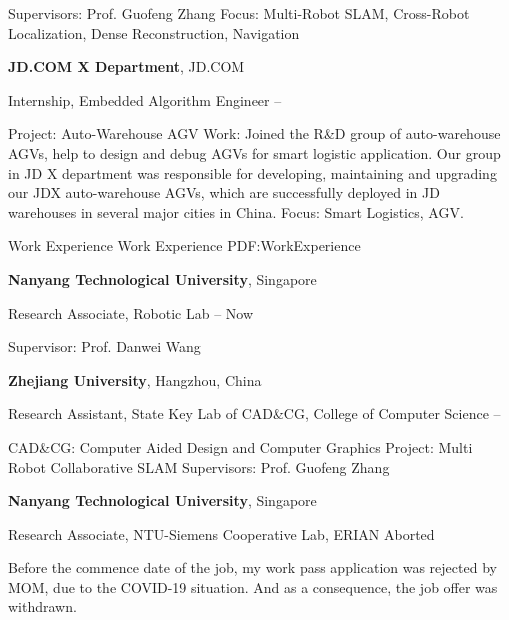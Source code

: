 \documentclass[letterpaper,MMMyyyy,nonstopmode]{simpleresumecv}
\begin{document}
\begin{Body}
\begin{Detail}
\SubBulletItem
Supervisors:
Prof. Guofeng Zhang
\SubBulletItem
Focus:
Multi-Robot SLAM, Cross-Robot Localization, Dense Reconstruction, Navigation
\end{Detail}


\Entry
{\textbf{JD.COM X Department}}, JD.COM

\BulletItem
Internship, Embedded Algorithm Engineer
\hfill
{} --
\begin{Detail}
	\SubBulletItem
	Project:
	Auto-Warehouse AGV
	\SubBulletItem
	Work:
	Joined the R\&D group of auto-warehouse AGVs, help to design and debug AGVs for smart logistic application.
	Our group in JD X department was responsible for developing, maintaining and upgrading our JDX auto-warehouse AGVs, which are successfully deployed in JD warehouses in several major cities in China.
	\SubBulletItem
	Focus:
	Smart Logistics, AGV.
\end{Detail}


\Section
{Work\newline
	Experience}
{Work Experience}
{PDF:WorkExperience}

\Entry
{\textbf{Nanyang Technological University}},
Singapore

\BulletItem
Research Associate,
Robotic Lab
\hfill
{} --
Now
\begin{Detail}
	\SubBulletItem
	Supervisor:
	Prof. Danwei Wang
\end{Detail}

\Gap
\Entry
{\textbf{Zhejiang University}},
Hangzhou, China

\BulletItem
Research Assistant,
State Key Lab of CAD\&CG,
College of Computer Science
\hfill
{} --
\begin{Detail}
	\SubBulletItem
	CAD\&CG: Computer Aided Design and Computer Graphics
	\SubBulletItem
	Project: Multi Robot Collaborative SLAM
	\SubBulletItem
	\SubBulletItem
	Supervisors:
	Prof. Guofeng Zhang
\end{Detail}

\Gap
\Entry
{\textbf{Nanyang Technological University}},
Singapore

\BulletItem
Research Associate,
NTU-Siemens Cooperative Lab, ERIAN
\hfill
Aborted
\begin{Detail}
	\SubBulletItem
	Before the commence date of the job, my work pass application was rejected by MOM, due to the COVID-19 situation. And as a consequence, the job offer was withdrawn.
\end{Detail}


\end{Body}
\end{document}
